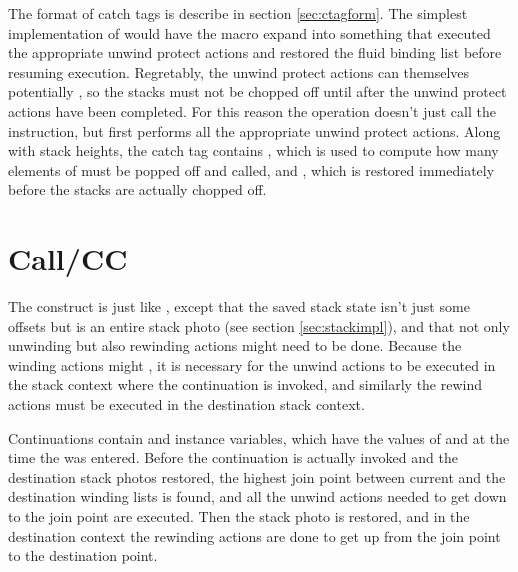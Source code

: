 The format of catch tags is describe in section \ref{sec:ctagform}.
The simplest implementation of  would have the
 macro expand into something that executed the
appropriate unwind protect actions and restored the fluid binding list
before resuming execution.  Regretably, the unwind protect actions can
themselves potentially , so the stacks must not be chopped
off until after the unwind protect actions have been completed.  For
this reason the  operation doesn't just call the 
instruction, but first performs all the appropriate unwind protect
actions.  Along with stack heights, the catch tag contains
, which is used to compute how many elements of
 must be popped off and called, and
, which is restored immediately before
the stacks are actually chopped off.


\section{Call/CC}

The  construct is just like , except that
the saved stack state isn't just some offsets but is an entire stack
photo (see section \ref{sec:stackimpl}), and that not only unwinding
but also rewinding actions might need to be done.  Because the winding
actions might , it is necessary for the unwind actions to be
executed in the stack context where the continuation is invoked, and
similarly the rewind actions must be executed in the destination stack
context.


Continuations contain  and 
instance variables, which have the values of  and
 at the time the  was entered.  Before
the continuation is actually invoked and the destination stack photos
restored, the highest join point between current and the destination
winding lists is found, and all the unwind actions needed to get down
to the join point are executed.  Then the stack photo is restored, and
in the destination context the rewinding actions are done to get up
from the join point to the destination point.


